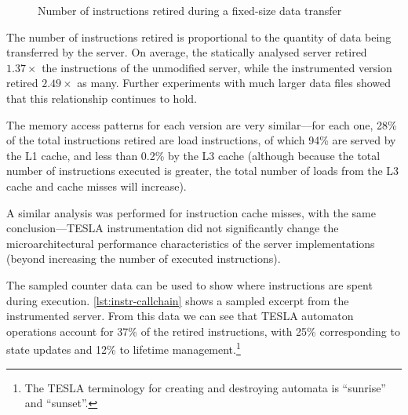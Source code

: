 \begin{figure}
  \centering
  \caption{Number of instructions retired during a fixed-size data
  transfer}
  \label{fig:retired-bench}
\end{figure}

The number of instructions retired is proportional to the quantity of data being
transferred by the server. On average, the statically analysed server retired
$1.37\times$ the instructions of the unmodified server, while the instrumented
version retired $2.49\times$ as many. Further experiments with much larger data
files showed that this relationship continues to hold.

The memory access patterns for each version are very similar---for each
one, 28\% of the total instructions retired are load instructions, of
which 94\% are served by the L1 cache, and less than 0.2\% by the L3
cache (although because the total number of instructions executed is
greater, the total number of loads from the L3 cache and cache misses
will increase).

A similar analysis was performed for instruction cache misses, with the
same conclusion---TESLA instrumentation did not significantly change the
microarchitectural performance characteristics of the server
implementations (beyond increasing the number of executed instructions).

The sampled counter data can be used to show where instructions are
spent during execution. \autoref{lst:instr-callchain} shows a sampled
excerpt from the instrumented server. From this data we can see that
TESLA automaton operations account for 37\% of the retired instructions,
with 25\% corresponding to state updates and 12\% to lifetime
management.\footnote{The TESLA terminology for creating and destroying
automata is ``sunrise'' and ``sunset''.}

